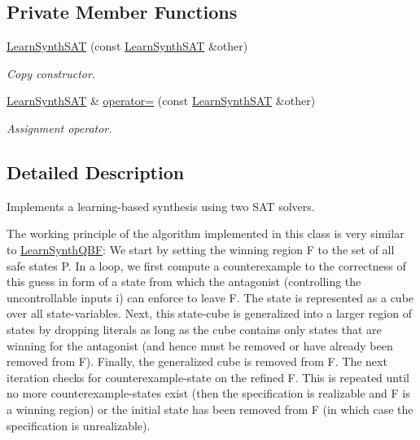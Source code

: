 \subsection*{Private Member Functions}
\begin{DoxyCompactItemize}
\item 
\hyperlink{classLearnSynthSAT_ae4a63ec1333eb53c2026f4e170dc12e1}{Learn\-Synth\-S\-A\-T} (const \hyperlink{classLearnSynthSAT}{Learn\-Synth\-S\-A\-T} \&other)
\begin{DoxyCompactList}\small\item\em Copy constructor. \end{DoxyCompactList}\item 
\hyperlink{classLearnSynthSAT}{Learn\-Synth\-S\-A\-T} \& \hyperlink{classLearnSynthSAT_af61b7eb7b2f4b88f358bc0d28b774293}{operator=} (const \hyperlink{classLearnSynthSAT}{Learn\-Synth\-S\-A\-T} \&other)
\begin{DoxyCompactList}\small\item\em Assignment operator. \end{DoxyCompactList}\end{DoxyCompactItemize}


\subsection{Detailed Description}
Implements a learning-\/based synthesis using two S\-A\-T solvers. 

The working principle of the algorithm implemented in this class is very similar to \hyperlink{classLearnSynthQBF}{Learn\-Synth\-Q\-B\-F}\-: We start by setting the winning region F to the set of all safe states P. In a loop, we first compute a counterexample to the correctness of this guess in form of a state from which the antagonist (controlling the uncontrollable inputs i) can enforce to leave F. The state is represented as a cube over all state-\/variables. Next, this state-\/cube is generalized into a larger region of states by dropping literals as long as the cube contains only states that are winning for the antagonist (and hence must be removed or have already been removed from F). Finally, the generalized cube is removed from F. The next iteration checks for counterexample-\/state on the refined F. This is repeated until no more counterexample-\/states exist (then the specification is realizable and F is a winning region) or the initial state has been removed from F (in which case the specification is unrealizable).

